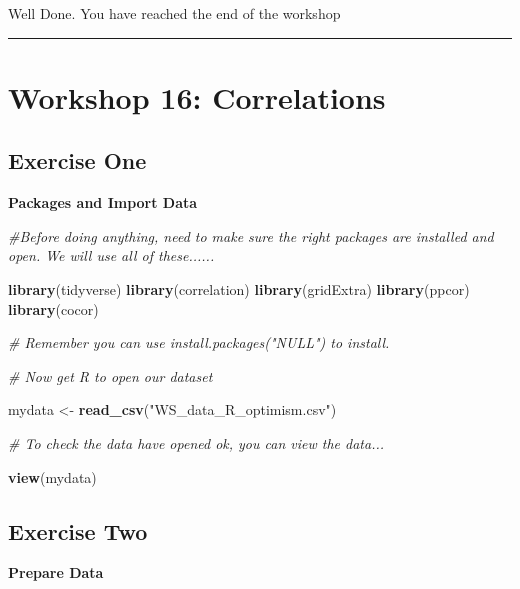 \documentclass[
]{book}
\newenvironment{Shaded}{\begin{snugshade}}{\end{snugshade}}
\newcommand{\CommentTok}[1]{\textcolor[rgb]{0.56,0.35,0.01}{\textit{#1}}}
\newcommand{\FunctionTok}[1]{\textcolor[rgb]{0.13,0.29,0.53}{\textbf{#1}}}
\newcommand{\NormalTok}[1]{#1}
\newcommand{\OtherTok}[1]{\textcolor[rgb]{0.56,0.35,0.01}{#1}}
\newcommand{\StringTok}[1]{\textcolor[rgb]{0.31,0.60,0.02}{#1}}
\let\oldsection\section
\renewcommand{\section}{\needspace{5\baselineskip}\oldsection}
\begin{document}
Well Done.
You have reached the end of the workshop

\begin{center}\rule{0.5\linewidth}{0.5pt}\end{center}

\chapter{Workshop 16: Correlations}\label{workshop-16-correlations}

\section{Exercise One}\label{exercise-one}

\textbf{Packages and Import Data}

\begin{Shaded}
\begin{Highlighting}[]
\CommentTok{\#Before doing anything, need to make sure the right packages are installed and open. We will use all of these......}

\FunctionTok{library}\NormalTok{(tidyverse)}
\FunctionTok{library}\NormalTok{(correlation)}
\FunctionTok{library}\NormalTok{(gridExtra)}
\FunctionTok{library}\NormalTok{(ppcor)}
\FunctionTok{library}\NormalTok{(cocor)}

\CommentTok{\# Remember you can use install.packages("NULL") to install.}
\end{Highlighting}
\end{Shaded}

\begin{Shaded}
\begin{Highlighting}[]
\CommentTok{\# Now get R to open our dataset}

\NormalTok{mydata }\OtherTok{\textless{}{-}} \FunctionTok{read\_csv}\NormalTok{(}\StringTok{"WS\_data\_R\_optimism.csv"}\NormalTok{)}

\CommentTok{\# To check the data have opened ok, you can view the data...}

\FunctionTok{view}\NormalTok{(mydata)}
\end{Highlighting}
\end{Shaded}

\section{Exercise Two}\label{exercise-two-1}

\textbf{Prepare Data}
\end{document}
